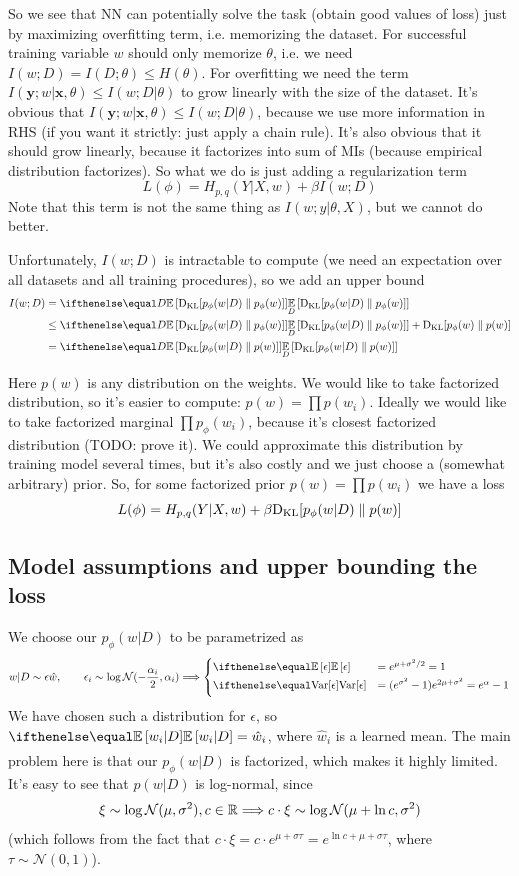 \documentclass{article}
\begin{document}
So we see that NN can potentially solve the task (obtain good values of loss) just by maximizing overfitting term, i.e. memorizing the dataset.
For successful training variable $w$ should only memorize $\theta$, i.e. we need $I(w;D) = I(D;\theta) \leq H(\theta)$.
For overfitting we need the term $I(\bm y; w | \bm x, \theta) \leq I(w; D | \theta)$ to grow linearly with the size of the dataset.
It's obvious that $I(\bm y; w | \bm x, \theta) \leq I(w; D | \theta)$, because we use more information in RHS (if you want it strictly: just apply a chain rule).
It's also obvious that it should grow linearly, because it factorizes into sum of MIs (because empirical distribution factorizes).
So what we do is just adding a regularization term
\[
L(\phi) = H_{p,q}(Y|X,w) + \beta I(w;D)
\]
Note that this term is not the same thing as $I(w;y|\theta, X)$, but we cannot do better.

Unfortunately, $I(w;D)$ is intractable to compute (we need an expectation over all datasets and all training procedures), so we add an upper bound
\begin{equation}
\begin{split}
I(w; D) &= \expect[D]{\kl{p_\phi(w|D)}{p_\phi(w)}}
\\
&\leq \expect[D]{\kl{p_\phi(w|D)}{p_\phi(w)}} + \kl{p_\phi(w)}{p(w)}
\\
&= \expect[D]{\kl{p_\phi(w|D)}{p(w)}}
\end{split}
\end{equation}

Here $p(w)$ is any distribution on the weights.
We would like to take factorized distribution, so it's easier to compute: $p(w) = \prod p(w_i)$.
Ideally we would like to take factorized marginal $\prod p_\phi(w_i)$, because it's closest factorized distribution (TODO: prove it).
We could approximate this distribution by training model several times, but it's also costly and we just choose a (somewhat arbitrary) prior.
So, for some factorized prior $p(w) = \prod p(w_i)$ we have a loss
\[
L(\phi) = H_{p,q}(Y|X,w) + \beta \text{D}_\text{KL}[p_\phi(w|D) \parallel p(w)]
\]

\subsection*{Model assumptions and upper bounding the loss}
We choose our $p_\phi(w|D)$ to be parametrized as
\[
w|D \sim \epsilon \hat w, \qquad \epsilon_i \sim \log \mathcal{N}(-\frac{\alpha_i}{2}, \alpha_i)
\Longrightarrow
\begin{cases}
\expect{\epsilon} &= e^{\mu + \sigma^2/2} = 1 \\
\var{\epsilon} &= (e^{\sigma^2} - 1)e^{2\mu + \sigma^2} = e^\alpha - 1
\end{cases}
\]
We have chosen such a distribution for $\epsilon$, so $\expect{w_i|D} = \hat w_i$, where $\hat w_i$ is a learned mean.
The main problem here is that our $p_\phi(w|D)$ is factorized, which makes it highly limited.
It's easy to see that $p(w|D)$ is log-normal, since
\[
\xi \sim \log \mathcal{N}(\mu, \sigma^2), c \in \mathbb{R} \Longrightarrow c \cdot \xi \sim \log \mathcal{N}(\mu + \ln c, \sigma^2)
\]
(which follows from the fact that $c\cdot\xi = c\cdot e^{\mu + \sigma \tau} = e^{\ln c + \mu + \sigma \tau}$, where $\tau \sim \mathcal{N}(0, 1)$).
\end{document}
